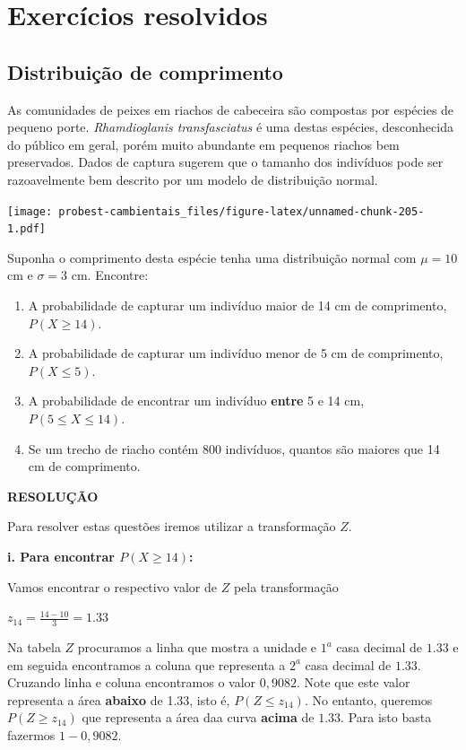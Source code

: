 \documentclass[
]{book}
\providecommand{\tightlist}{%
  \setlength{\itemsep}{0pt}\setlength{\parskip}{0pt}}
\begin{document}
\hypertarget{exercuxedcios-resolvidos}{%
\section{Exercícios resolvidos}\label{exercuxedcios-resolvidos}}

\hypertarget{distribuiuxe7uxe3o-de-comprimento}{%
\subsection{Distribuição de comprimento}\label{distribuiuxe7uxe3o-de-comprimento}}

As comunidades de peixes em riachos de cabeceira são compostas por espécies de pequeno porte. \emph{Rhamdioglanis transfasciatus} é uma destas espécies, desconhecida do público em geral, porém muito abundante em pequenos riachos bem preservados. Dados de captura sugerem que o tamanho dos indivíduos pode ser razoavelmente bem descrito por um modelo de distribuição normal.

\texttt{[image: probest-cambientais\_files/figure-latex/unnamed-chunk-205-1.pdf]}

Suponha o comprimento desta espécie tenha uma distribuição normal com \(\mu = 10\) cm e \(\sigma = 3\) cm. Encontre:

\begin{enumerate}
\def\labelenumi{\roman{enumi}.}
\tightlist
\item
  A probabilidade de capturar um indivíduo maior de 14 cm de comprimento, \(P(X \ge 14)\).
\item
  A probabilidade de capturar um indivíduo menor de 5 cm de comprimento, \(P(X \le 5)\).
\item
  A probabilidade de encontrar um indivíduo \textbf{entre} 5 e 14 cm, \(P(5 \le X \le 14)\).
\item
  Se um trecho de riacho contém 800 indivíduos, quantos são maiores que 14 cm de comprimento.
\end{enumerate}

\textbf{RESOLUÇÃO}

Para resolver estas questões iremos utilizar a transformação \(Z\).

\textbf{i. Para encontrar \(P(X \ge 14)\):}

Vamos encontrar o respectivo valor de \(Z\) pela transformação

\(z_{14} = \frac{14 - 10}{3} = 1.33\)

Na tabela \(Z\) procuramos a linha que mostra a unidade e \(1^a\) casa decimal de \(1.33\) e em seguida encontramos a coluna que representa a \(2^a\) casa decimal de \(1.33\). Cruzando linha e coluna encontramos o valor \(0,9082\). Note que este valor representa a área \textbf{abaixo} de 1.33, isto é, \(P(Z \le z_{14})\). No entanto, queremos \(P(Z \ge z_{14})\) que representa a área daa curva \textbf{acima} de \(1.33\). Para isto basta fazermos \(1 - 0,9082\).
\end{document}
